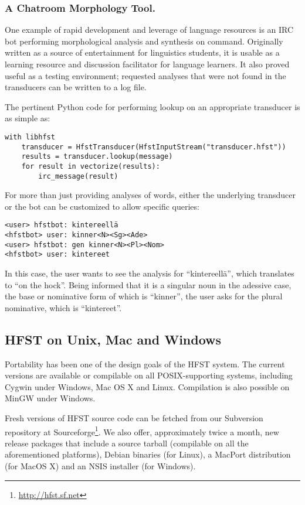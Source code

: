 \documentclass{llncs}
\begin{document}
\subsubsection{A Chatroom Morphology Tool.}
One example of rapid development and leverage of language resources is
an IRC bot performing morphological analysis and synthesis on command.
Originally written as a source of entertainment for linguistics students,
it is usable as a learning resource and discussion facilitator for
language learners. It also proved useful as a testing environment;
requested analyses that were not found in the transducers can be written to a
log file.

The pertinent Python code for performing lookup on an appropriate transducer
is as simple as:

\begin{verbatim}
with libhfst
    transducer = HfstTransducer(HfstInputStream("transducer.hfst"))
    results = transducer.lookup(message)
    for result in vectorize(results):
        irc_message(result)
\end{verbatim}

For more than just providing analyses of words, either the underlying transducer
or the bot can be customized to allow specific queries:

\begin{verbatim}
<user> hfstbot: kintereellä
<hfstbot> user: kinner<N><Sg><Ade>
<user> hfstbot: gen kinner<N><Pl><Nom>
<hfstbot> user: kintereet
\end{verbatim}

In this case, the user wants to see the analysis for ``kintereellä'',
which translates to ``on the hock''. Being informed that it is
a singular noun in the adessive case, the base or nominative form of which
is ``kinner'', the user asks for the plural nominative, which is ``kintereet''.

\subsection{HFST on Unix, Mac and Windows}

Portability has been one of the design goals of the HFST system. The
current versions are available or compilable on all POSIX-supporting
systems, including Cygwin under Windows, Mac OS X and Linux. 
Compilation is also possible on MinGW under Windows.

Fresh versions of HFST source code can be fetched from our Subversion
repository at Sourceforge\footnote{\url{http://hfst.sf.net}}. We also offer, approximately twice a month, new
release packages that include a source tarball (compilable on all the
aforementioned platforms), Debian binaries (for Linux), a MacPort
distribution (for MacOS X) and an NSIS installer (for Windows).
\end{document}
